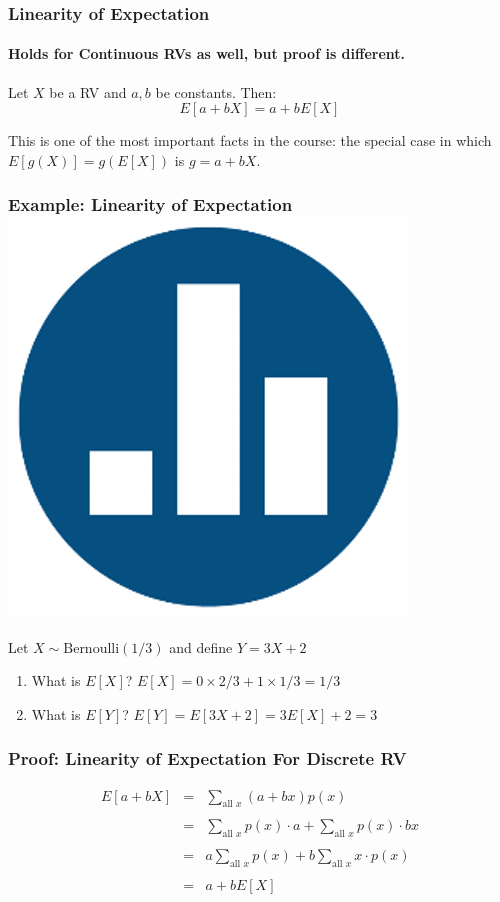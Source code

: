 \begin{frame}
\frametitle{Linearity of Expectation}
\framesubtitle{Holds for Continuous RVs as well, but proof is different.}
Let $X$ be a RV and $a,b$ be constants. Then:
	$$E[a + bX] = a + bE[X]$$
\vspace{2em}
\begin{alertblock}{This is one of the most important facts in the course: the special case in which $E[g(X)] = g(E[X])$ is $g = a+bX$.}
\end{alertblock}
\end{frame}
\begin{frame}
\frametitle{Example: Linearity of Expectation \hfill \includegraphics[scale = 0.05]{./images/clicker} }
Let $X \sim \mbox{Bernoulli}(1/3)$ and define $Y = 3X + 2$
\vspace{1em}

\begin{enumerate}
  \item What is $E[X]$? \pause \hspace{2em} \alert{$E[X] = 0 \times 2/3 + 1 \times 1/3 = 1/3$} \pause
  \item What is $E[Y]$? \pause \hspace{2em} \alert{$E[Y] = E[3X + 2] = 3E[X] + 2 = 3$}
\end{enumerate}
\end{frame}

\begin{frame}
\frametitle{Proof: Linearity of Expectation For Discrete RV}

\begin{eqnarray*}
	E[a + bX] &=& \sum_{\mbox{all } x}  (a + bx) p(x)\\ \\
	 &=&  \sum_{\mbox{all } x} p(x) \cdot a + \sum_{\mbox{all } x}p(x) \cdot bx\\ \\
	&=&  a\sum_{\mbox{all } x} p(x) + b\sum_{\mbox{all } x} x \cdot p(x) \\ \\
	&=&  a + b E[X]
\end{eqnarray*}


\end{frame}
